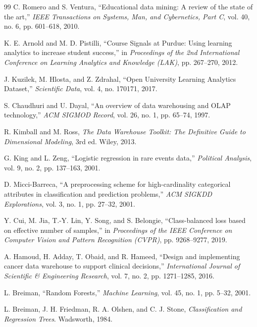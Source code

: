 \documentclass[conference]{IEEEtran}
\begin{document}
\begin{thebibliography}{99}
 C. Romero and S. Ventura, ``Educational data mining: A review of the state of the art,'' \textit{IEEE Transactions on Systems, Man, and Cybernetics, Part C}, vol. 40, no. 6, pp. 601--618, 2010.

 K. E. Arnold and M. D. Pistilli, ``Course Signals at Purdue: Using learning analytics to increase student success,'' in \textit{Proceedings of the 2nd International Conference on Learning Analytics and Knowledge (LAK)}, pp. 267--270, 2012.

 J. Kuzilek, M. Hlosta, and Z. Zdrahal, ``Open University Learning Analytics Dataset,'' \textit{Scientific Data}, vol. 4, no. 170171, 2017.

 S. Chaudhuri and U. Dayal, ``An overview of data warehousing and OLAP technology,'' \textit{ACM SIGMOD Record}, vol. 26, no. 1, pp. 65--74, 1997.

 R. Kimball and M. Ross, \textit{The Data Warehouse Toolkit: The Definitive Guide to Dimensional Modeling}, 3rd ed. Wiley, 2013.

 G. King and L. Zeng, ``Logistic regression in rare events data,'' \textit{Political Analysis}, vol. 9, no. 2, pp. 137--163, 2001.

 D. Micci-Barreca, ``A preprocessing scheme for high-cardinality categorical attributes in classification and prediction problems,'' \textit{ACM SIGKDD Explorations}, vol. 3, no. 1, pp. 27--32, 2001.

 Y. Cui, M. Jia, T.-Y. Lin, Y. Song, and S. Belongie, ``Class-balanced loss based on effective number of samples,'' in \textit{Proceedings of the IEEE Conference on Computer Vision and Pattern Recognition (CVPR)}, pp. 9268--9277, 2019.

 A. Hamoud, H. Adday, T. Obaid, and R. Hameed, ``Design and implementing cancer data warehouse to support clinical decisions,'' \textit{International Journal of Scientific \& Engineering Research}, vol. 7, no. 2, pp. 1271--1285, 2016.

 L. Breiman, ``Random Forests,'' \textit{Machine Learning}, vol. 45, no. 1, pp. 5--32, 2001.

 L. Breiman, J. H. Friedman, R. A. Olshen, and C. J. Stone, \textit{Classification and Regression Trees}. Wadsworth, 1984.
\end{thebibliography}
\end{document}
